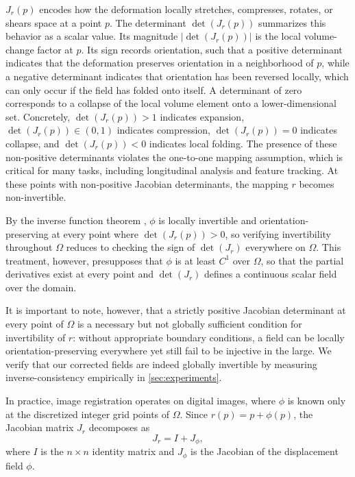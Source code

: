 $J_r(p)$ encodes how the deformation locally stretches, compresses, rotates, or shears space at a point $p$. The determinant $\det(J_r(p))$ summarizes this behavior as a scalar value. Its magnitude $|\det(J_r(p))|$ is the local volume-change factor at $p$. Its sign records orientation, such that a positive determinant indicates that the deformation preserves orientation in a neighborhood of $p$, while a negative determinant indicates that orientation has been reversed locally, which can only occur if the field has folded onto itself. A determinant of zero corresponds to a collapse of the local volume element onto a lower-dimensional set. Concretely, $\det(J_r(p)) > 1$ indicates expansion, $\det(J_r(p)) \in (0,1)$ indicates compression, $\det(J_r(p)) = 0$ indicates collapse, and $\det(J_r(p)) < 0$ indicates local folding. The presence of these non-positive determinants violates the one-to-one mapping assumption, which is critical for many tasks, including longitudinal analysis and feature tracking. At these points with non-positive Jacobian determinants, the mapping $r$ becomes non-invertible.

By the inverse function theorem \cite{implicit_function_theorem}, $\phi$ is locally invertible and orientation-preserving at every point where $\det(J_r(p)) > 0$, so verifying invertibility throughout $\Omega$ reduces to checking the sign of $\det(J_r)$ everywhere on $\Omega$. This treatment, however, presupposes that $\phi$ is at least $C^1$ over $\Omega$, so that the partial derivatives exist at every point and $\det(J_r)$ defines a continuous scalar field over the domain.

It is important to note, however, that a strictly positive Jacobian determinant at every point of $\Omega$ is a necessary but not globally sufficient condition for invertibility of $r$: without appropriate boundary conditions, a field can be locally orientation-preserving everywhere yet still fail to be injective in the large. We verify that our corrected fields are indeed globally invertible by measuring inverse-consistency empirically in \autoref{sec:experiments}.

In practice, image registration operates on digital images, where $\phi$ is known only at the discretized integer grid points of $\Omega$. Since $r(p) = p + \phi(p)$, the Jacobian matrix $J_r$ decomposes as
\begin{equation} \label{eq:jacobian_decomposition}
    J_r = I + J_\phi,
\end{equation}
where $I$ is the $n \times n$ identity matrix and $J_\phi$ is the Jacobian of the displacement field $\phi$.

